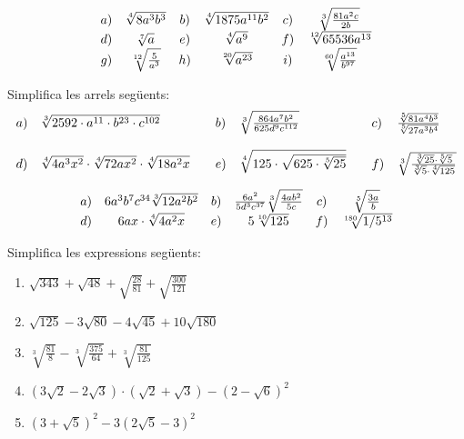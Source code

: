 \begin{indicacio}
%
\[
\begin{array}{cccccc}
a) & \sqrt[4]{8a^{3}b^{3}} & b) & \sqrt[4]{1875a^{11}b^{2}} & c) & \sqrt[3]{%
\frac{81a^{2}c}{2b}} \\ 
d) & \sqrt[7]{a} & e) & \sqrt[4]{a^{9}} & f) & \sqrt[12]{65536a^{13}} \\ 
g) & \sqrt[12]{\frac{5}{a^{3}}} & h) & \sqrt[20]{a^{23}} & i) & \sqrt[60]{%
\frac{a^{13}}{b^{97}}}%
\end{array}%
\]
\end{indicacio}

\begin{exercici}
Simplifica les arrels següents:%
\[
\begin{array}{llllllll}
a) & \sqrt[3]{2592\cdot a^{11}\cdot b^{23}\cdot c^{102}} &  & b) & \sqrt[3]{%
\frac{864a^{7}b^{2}}{625d^{9}c^{112}}} &  & c) & \frac{\sqrt[5]{81a^{4}b^{3}}%
}{\sqrt[5]{27a^{3}b^{4}}} \\ 
&  &  &  &  &  &  &  \\ 
d) & \sqrt[4]{4a^{3}x^{2}}\cdot \sqrt[4]{72ax^{2}}\cdot \sqrt[4]{18a^{2}x} & 
& e) & \sqrt[4]{125\cdot \sqrt{625\cdot \sqrt[5]{25}}} &  & f) & \sqrt[3]{%
\frac{\sqrt[3]{25}\cdot \sqrt[5]{5}}{\sqrt[3]{5}\cdot \sqrt[4]{125}}}%
\end{array}%
\]

\end{exercici}

\begin{indicacio}
%
\[
\begin{array}{cccccc}
a) & 6a^{3}b^{7}c^{34}\sqrt[3]{12a^{2}b^{2}} & b) & \frac{6a^{2}}{%
5d^{3}c^{37}}\sqrt[3]{\frac{4ab^{2}}{5c}} & c) & \sqrt[5]{\frac{3a}{b}} \\ 
d) & 6ax\cdot \sqrt[4]{4a^{2}x} & e) & 5\sqrt[10]{125} & f) & \sqrt[180]{%
1/5^{13}}%
\end{array}%
\]
\end{indicacio}

\begin{exercici}
Simplifica les expressions següents:

\begin{enumerate}
\item[a)] $\sqrt{343}+\sqrt{48}+\sqrt{\frac{28}{81}}+\sqrt{\frac{300}{121}}$

\item[b)] $\sqrt{125}-3\sqrt{80}-4\sqrt{45}+10\sqrt{180}$

\item[c)] $\sqrt[3]{\frac{81}{8}}-\sqrt[3]{\frac{375}{64}}+\sqrt[3]{\frac{81%
}{125}}$

\item[d)] $(3\sqrt{2}-2\sqrt{3})\cdot (\sqrt{2}+\sqrt{3})-(2-\sqrt{6})^{2}$

\item[e)] $(3+\sqrt{5})^{2}-3(2\sqrt{5}-3)^{2}$
\end{enumerate}

\end{exercici}

